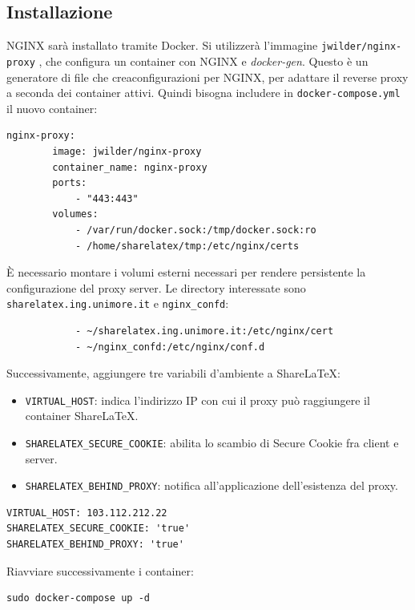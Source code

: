 \subsection{Installazione}
NGINX sarà installato tramite Docker. Si utilizzerà l'immagine \verb|jwilder/nginx-proxy| \cite{nginx-proxy}, che configura un container con NGINX e \emph{docker-gen}. Questo è un generatore di file che creaconfigurazioni per NGINX, per adattare il reverse proxy a seconda dei container attivi. Quindi bisogna includere in \verb|docker-compose.yml| il nuovo container:
\begin{lstlisting}
nginx-proxy:
        image: jwilder/nginx-proxy
        container_name: nginx-proxy
        ports:
            - "443:443"
        volumes:
            - /var/run/docker.sock:/tmp/docker.sock:ro
            - /home/sharelatex/tmp:/etc/nginx/certs
\end{lstlisting}
È necessario montare i volumi esterni necessari per rendere persistente la configurazione del proxy server. Le directory interessate sono \verb|sharelatex.ing.unimore.it| e \verb|nginx_confd|:
\begin{lstlisting}
            - ~/sharelatex.ing.unimore.it:/etc/nginx/cert
            - ~/nginx_confd:/etc/nginx/conf.d
\end{lstlisting}
Successivamente, aggiungere tre variabili d'ambiente a ShareLaTeX:
\begin{itemize}
    \item \verb|VIRTUAL_HOST|: indica l'indirizzo IP con cui il proxy può raggiungere il container ShareLaTeX.
    \item \verb|SHARELATEX_SECURE_COOKIE|: abilita lo scambio di Secure Cookie fra client e server.
    \item \verb|SHARELATEX_BEHIND_PROXY|: notifica all'applicazione dell'esistenza del proxy.
\end{itemize}
\begin{lstlisting}
VIRTUAL_HOST: 103.112.212.22
SHARELATEX_SECURE_COOKIE: 'true'
SHARELATEX_BEHIND_PROXY: 'true'
\end{lstlisting}
Riavviare successivamente i container:
\begin{lstlisting}
sudo docker-compose up -d
\end{lstlisting}

